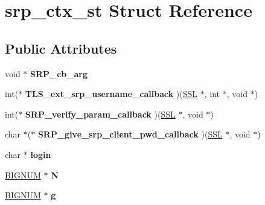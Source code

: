 \hypertarget{structsrp__ctx__st}{}\section{srp\+\_\+ctx\+\_\+st Struct Reference}
\label{structsrp__ctx__st}
\subsection*{Public Attributes}
\begin{DoxyCompactItemize}
\item 
\mbox{\label{structsrp__ctx__st_aa49970f50ded55c00d44e1601b40c9b1}} 
void $\ast$ {\bfseries S\+R\+P\+\_\+cb\+\_\+arg}
\item 
\mbox{\label{structsrp__ctx__st_a51a70bcd9e36e89c1d44bb74275ad4f3}} 
int($\ast$ {\bfseries T\+L\+S\+\_\+ext\+\_\+srp\+\_\+username\+\_\+callback} )(\hyperlink{structssl__st}{S\+SL} $\ast$, int $\ast$, void $\ast$)
\item 
\mbox{\label{structsrp__ctx__st_a3669dc44f2e7e4ed6ad7fe524187e70e}} 
int($\ast$ {\bfseries S\+R\+P\+\_\+verify\+\_\+param\+\_\+callback} )(\hyperlink{structssl__st}{S\+SL} $\ast$, void $\ast$)
\item 
\mbox{\label{structsrp__ctx__st_a800d2c5a1a2cf2f5f165e0f9c223d86b}} 
char $\ast$($\ast$ {\bfseries S\+R\+P\+\_\+give\+\_\+srp\+\_\+client\+\_\+pwd\+\_\+callback} )(\hyperlink{structssl__st}{S\+SL} $\ast$, void $\ast$)
\item 
\mbox{\label{structsrp__ctx__st_a9406590abd27d1bfb79b3f76c27b9c29}} 
char $\ast$ {\bfseries login}
\item 
\mbox{\label{structsrp__ctx__st_a207fb6e32702e2be6e8477d3acb19ddc}} 
\hyperlink{structbignum__st}{B\+I\+G\+N\+UM} $\ast$ {\bfseries N}
\item 
\mbox{\label{structsrp__ctx__st_a92c5d7f90a3fca1bbb24d6046ad69aa6}} 
\hyperlink{structbignum__st}{B\+I\+G\+N\+UM} $\ast$ {\bfseries g}
\item 
\mbox{\label{structsrp__ctx__st_aeabfb75bde4e22d7f33fa49b2ad84c3b}} 

\end{DoxyCompactItemize}
